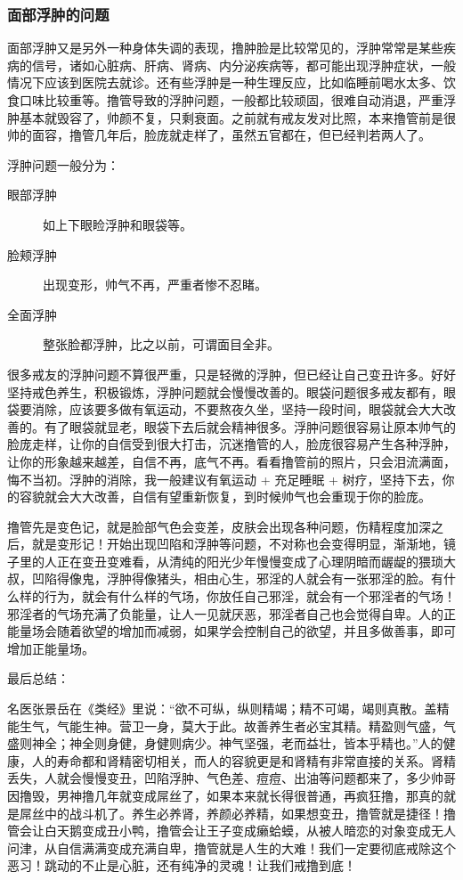 \documentclass{ctexart}
\begin{document}
\subsubsection{面部浮肿的问题}

面部浮肿又是另外一种身体失调的表现，撸肿脸是比较常见的，浮肿常常是某些疾病的信号，诸如心脏病、肝病、肾病、内分泌疾病等，都可能出现浮肿症状，一般情况下应该到医院去就诊。还有些浮肿是一种生理反应，比如临睡前喝水太多、饮食口味比较重等。撸管导致的浮肿问题，一般都比较顽固，很难自动消退，严重浮肿基本就毁容了，帅颜不复，只剩衰面。之前就有戒友发对比照，本来撸管前是很帅的面容，撸管几年后，脸庞就走样了，虽然五官都在，但已经判若两人了。

浮肿问题一般分为：

\begin{description}
    \item[眼部浮肿] 如上下眼睑浮肿和眼袋等。
    \item[脸颊浮肿] 出现变形，帅气不再，严重者惨不忍睹。
    \item[全面浮肿] 整张脸都浮肿，比之以前，可谓面目全非。
\end{description}

很多戒友的浮肿问题不算很严重，只是轻微的浮肿，但已经让自己变丑许多。好好坚持戒色养生，积极锻炼，浮肿问题就会慢慢改善的。眼袋问题很多戒友都有，眼袋要消除，应该要多做有氧运动，不要熬夜久坐，坚持一段时间，眼袋就会大大改善的。有了眼袋就显老，眼袋下去后就会精神很多。浮肿问题很容易让原本帅气的脸庞走样，让你的自信受到很大打击，沉迷撸管的人，脸庞很容易产生各种浮肿，让你的形象越来越差，自信不再，底气不再。看看撸管前的照片，只会泪流满面，悔不当初。浮肿的消除，我一般建议有氧运动 + 充足睡眠 + 树疗，坚持下去，你的容貌就会大大改善，自信有望重新恢复，到时候帅气也会重现于你的脸庞。

撸管先是变色记，就是脸部气色会变差，皮肤会出现各种问题，伤精程度加深之后，就是变形记！开始出现凹陷和浮肿等问题，不对称也会变得明显，渐渐地，镜子里的人正在变丑变难看，从清纯的阳光少年慢慢变成了心理阴暗而龌龊的猥琐大叔，凹陷得像鬼，浮肿得像猪头，相由心生，邪淫的人就会有一张邪淫的脸。有什么样的行为，就会有什么样的气场，你放任自己邪淫，就会有一个邪淫者的气场！邪淫者的气场充满了负能量，让人一见就厌恶，邪淫者自己也会觉得自卑。人的正能量场会随着欲望的增加而减弱，如果学会控制自己的欲望，并且多做善事，即可增加正能量场。

最后总结：

名医张景岳在《类经》里说：“欲不可纵，纵则精竭；精不可竭，竭则真散。盖精能生气，气能生神。营卫一身，莫大于此。故善养生者必宝其精。精盈则气盛，气盛则神全；神全则身健，身健则病少。神气坚强，老而益壮，皆本乎精也。”人的健康，人的寿命都和肾精密切相关，而人的容貌更是和肾精有非常直接的关系。肾精丢失，人就会慢慢变丑，凹陷浮肿、气色差、痘痘、出油等问题都来了，多少帅哥因撸毁，男神撸几年就变成屌丝了，如果本来就长得很普通，再疯狂撸，那真的就是屌丝中的战斗机了。养生必养肾，养颜必养精，如果想变丑，撸管就是捷径！撸管会让白天鹅变成丑小鸭，撸管会让王子变成癞蛤蟆，从被人暗恋的对象变成无人问津，从自信满满变成充满自卑，撸管就是人生的大难！我们一定要彻底戒除这个恶习！跳动的不止是心脏，还有纯净的灵魂！让我们戒撸到底！
\end{document}

